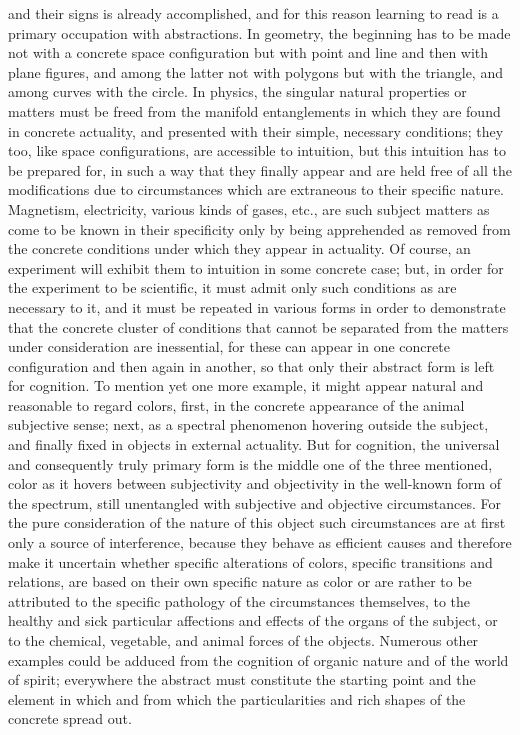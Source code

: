 and their signs is already accomplished,
and for this reason learning to read
is a primary occupation with abstractions.
In geometry, the beginning has to be made
not with a concrete space configuration
but with point and line
and then with plane figures,
and among the latter not with polygons but
with the triangle, and among curves with the circle.
In physics, the singular natural properties or matters
must be freed from the manifold entanglements
in which they are found in concrete actuality,
and presented with their simple, necessary conditions;
they too, like space configurations,
are accessible to intuition,
but this intuition has to be prepared for,
in such a way that they finally appear
and are held free of all the modifications
due to circumstances which are extraneous
to their specific nature.
Magnetism, electricity, various kinds of gases, etc.,
are such subject matters as come to be known
in their specificity only by being apprehended
as removed from the concrete conditions
under which they appear in actuality.
Of course, an experiment will exhibit them
to intuition in some concrete case;
but, in order for the experiment to be scientific,
it must admit only such conditions as
are necessary to it,
and it must be repeated in various forms
in order to demonstrate that
the concrete cluster of conditions
that cannot be separated from
the matters under consideration are inessential,
for these can appear in one concrete configuration
and then again in another,
so that only their abstract form is left for cognition.
To mention yet one more example,
it might appear natural and reasonable to regard colors,
first, in the concrete appearance of the animal subjective sense;
next, as a spectral phenomenon hovering outside the subject,
and finally fixed in objects in external actuality.
But for cognition, the universal
and consequently truly primary form is
the middle one of the three mentioned,
color as it hovers between subjectivity and objectivity
in the well-known form of the spectrum,
still unentangled with subjective and objective circumstances.
For the pure consideration of the nature of
this object such circumstances are
at first only a source of interference,
because they behave as efficient causes
and therefore make it uncertain
whether specific alterations of colors,
specific transitions and relations,
are based on their own specific nature as color
or are rather to be attributed to
the specific pathology of the circumstances themselves,
to the healthy and sick particular affections
and effects of the organs of the subject,
or to the chemical, vegetable,
and animal forces of the objects.
Numerous other examples could be adduced
from the cognition of organic nature
and of the world of spirit;
everywhere the abstract must constitute
the starting point and the element
in which and from which the
particularities and rich shapes
of the concrete spread out.

